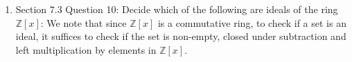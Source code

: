 \documentclass{article}
\begin{document}
\begin{enumerate}[label={\bf Q\arabic*:}]
\begin{proof}
\begin{align*}
        \\
          &= (a_1a_2,d_1d_2) \\
          &= (a_1,d_1)(a_2,d_2) \\
          &= \varphi(\begin{pmatrix}a_1&b_1\\0&d_1\end{pmatrix}) \varphi(
            \begin{pmatrix}a_2&b_2\\0&d_2\end{pmatrix}). \\
      \end{align*}

      The map is clearly surjective: Given
      $(a,d)\in\mathbb{Z}\times\mathbb{Z}$, the matrix
      $\begin{pmatrix}a&0\\0&d\end{pmatrix}$ is an inverse image of
      $(a,d)$. \\

      The kernel of $\varphi$ are the upper triangular matrices with
      $a=d=0$, i.e.
      \[\ker(\varphi)=\{\begin{pmatrix}0&b\\0&0\end{pmatrix}:
      b\in\mathbb{Z}\}.\]
    \end{proof}

  \item Section 7.3 Question 10: Decide which of the following are ideals
    of the ring $\mathbb{Z}[x]$:
    We note that since $\mathbb{Z}[x]$ is a commutative ring, to check if a
    set is an ideal, it suffices to check if the set is non-empty, closed
    under subtraction and left multiplication by elements in
    $\mathbb{Z}[x]$.


\end{enumerate}
\end{document}
